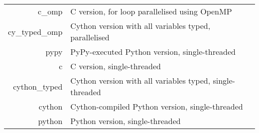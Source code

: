 \begin{tabular}{rl}
	c\_omp         & C version, for loop parallelised using OpenMP \\
	cy\_typed\_omp & Cython version with all variables typed, parallelised \\
	pypy           & PyPy-executed Python version, single-threaded \\
	c              & C version, single-threaded \\
	cython\_typed  & Cython version with all variables typed, single-threaded \\
	cython         & Cython-compiled Python version, single-threaded \\
	python         & Python version, single-threaded \\
\end{tabular}

